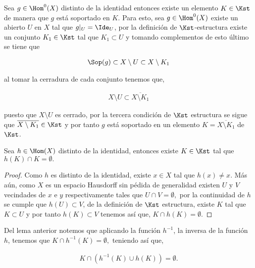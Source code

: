 \begin{ob}\label{ob:hom_sop_en_Ks}
Sea $g \in \Hom^0(X)$ distinto de la identidad entonces existe un elemento $K \in \Kst$ de manera que $g$ está soportado en $K$. Para esto, sea $g \in \Hom^0(X)$ existe un abierto $U$ en $X$ tal que $g|_U=\Ide_U$, por la definición de $\Kst$-estructura existe un conjunto $K_1 \in \Kst$ tal que $K_1 \subset U$ y tomando complementos de esto último se tiene que 

	\begin{align*}
	\Sop(g) \subset X \setminus U \subset X \setminus K_1
	\end{align*}

al tomar la cerradura de cada conjunto tenemos que,

	\begin{align*}
	X \setminus U \subset \overline{ X \setminus K_1}
	\end{align*}

puesto que $X \setminus U$ es cerrado, por la tercera condición de $\Kst$ estructura se sigue que $\overline{ X \setminus K_1} \in \Kst$ y por tanto $g$ está soportado en un elemento $K = \overline{ X \setminus K_1}$ de $\Kst$.
\end{ob}



\begin{lm}\label{lm:K_separado_por_h}
Sea $h \in \Hom(X)$ distinto de la identidad, entonces existe $K \in \Kst$ tal que $h(K) \cap K = \emptyset.$
\end{lm}

\begin{proof}
Como $h$ es distinto de la identidad, existe $x \in X$ tal que $h(x) \neq x$. Más aún, como $X$ es un espacio Hausdorff sin pédida de generalidad existen $U$ y $V$ vecindades de $x$ e $y$ respectivamente tales que $U \cap V  = \emptyset,$ por la continuidad de $h$ se cumple que $h(U) \subset V$, de la definición de $\Kst$ estructura, existe $K$ tal que $K \subset U$ y por tanto $h(K) \subset V$ tenemos así que, $K \cap h(K) = \emptyset.$

\end{proof}

\begin{ob}
Del lema anterior notemos que aplicando la función $h^{-1}$, la inversa de la función $h$, tenemos que $K \cap h^{-1}(K) = \emptyset,$ teniendo así que,

	\begin{align*}
    K \cap (h^{-1}(K) \cup h(K)) = \emptyset.
	\end{align*}
	
\end{ob}


